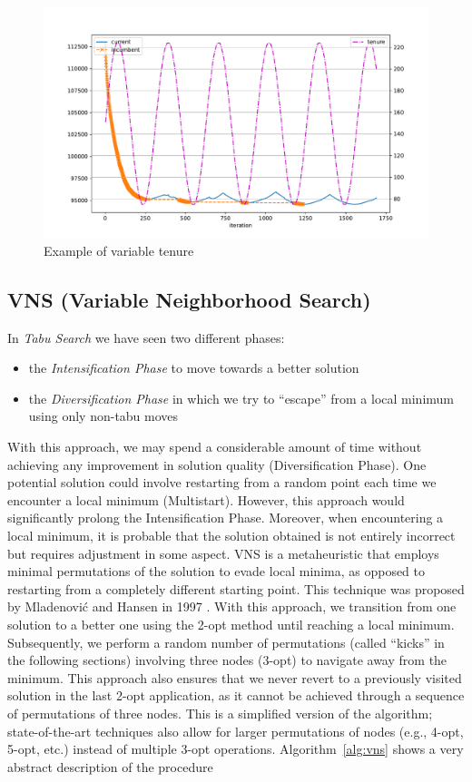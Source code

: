 \documentclass{article}
\begin{document}
\begin{figure}[ht]
        \caption{Example of variable tenure}
        \label{fig:sin_ten}
        \centering
        \includegraphics[width=400pt]{assets/sin_ten.pdf}
\end{figure}

\clearpage

\subsection{VNS (Variable Neighborhood Search)}
In \textit{Tabu Search} we have seen two different phases:
\begin{itemize}
        \item the \textit{Intensification Phase} to move towards a better solution
        \item the \textit{Diversification Phase} in which we try to ``escape'' from a local minimum using only
        non-tabu moves
\end{itemize}
With this approach, we may spend a considerable amount of time without achieving any improvement in
solution quality (Diversification Phase). One potential solution could involve restarting from a random
point each time we encounter a local minimum (Multistart). However, this approach would significantly
prolong the Intensification Phase. Moreover, when encountering a local minimum, it is probable
that the solution obtained is not entirely incorrect but requires adjustment in some aspect.
VNS is a metaheuristic that employs minimal permutations of the solution to evade local minima, as
opposed to restarting from a completely different starting point.
This technique was proposed by Mladenovi{\'c} and Hansen in 1997 \cite{mladenovic1997variable}.
With this approach, we transition from one solution to a better one using the 2-opt method until reaching
a local minimum. Subsequently, we perform a random number of permutations (called ``kicks'' in the following sections)
involving three nodes (3-opt) to navigate away from the minimum.
This approach also ensures that we never revert to a previously visited
solution in the last 2-opt application, as it cannot be achieved through a sequence of permutations of
three nodes.
This is a simplified version of the algorithm; state-of-the-art techniques also allow for larger permutations
of nodes (e.g., 4-opt, 5-opt, etc.) instead of multiple 3-opt operations.
Algorithm~\ref{alg:vns} shows a very abstract description of the procedure
\end{document}
